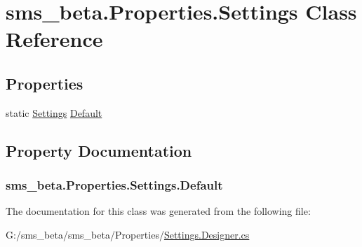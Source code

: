 \hypertarget{classsms__beta_1_1_properties_1_1_settings}{
\section{sms\_\-beta.Properties.Settings Class Reference}
\label{classsms__beta_1_1_properties_1_1_settings}
}
\subsection*{Properties}
\begin{DoxyCompactItemize}
\item 
static \hyperlink{classsms__beta_1_1_properties_1_1_settings}{Settings} \hyperlink{classsms__beta_1_1_properties_1_1_settings_a3d0e010814875457c4b56e08f293ee71}{Default}
\end{DoxyCompactItemize}


\subsection{Property Documentation}
\hypertarget{classsms__beta_1_1_properties_1_1_settings_a3d0e010814875457c4b56e08f293ee71}{
\subsubsection[{Default}]{ sms\_\-beta.Properties.Settings.Default}}
\label{classsms__beta_1_1_properties_1_1_settings_a3d0e010814875457c4b56e08f293ee71}


The documentation for this class was generated from the following file:\begin{DoxyCompactItemize}
\item 
G:/sms\_\-beta/sms\_\-beta/Properties/\hyperlink{_settings_8_designer_8cs}{Settings.Designer.cs}\end{DoxyCompactItemize}
